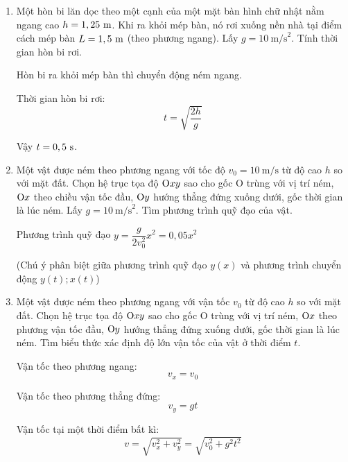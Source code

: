 \begin{enumerate}[label=\bfseries Câu \arabic*:]
{	Vậy thời gian rơi là $t=3,2\ \text s$.
}
\item {}

\cauhoi
{Một hòn bi lăn dọc theo một cạnh của một mặt bàn hình chữ nhật nằm ngang cao $h=1,25\ \text m$. Khi ra khỏi mép bàn, nó rơi xuống nền nhà tại điểm cách mép bàn $L=1,5\ \text m$ (theo phương ngang). Lấy $g=10\ \text{m/s}^2$. Tính thời gian hòn bi rơi.
}

\loigiai
{	Hòn bi ra khỏi mép bàn thì chuyển động ném ngang.
	
	Thời gian hòn bi rơi:
	\[t=\sqrt{\dfrac{2h}{g}}\]
	
	Vậy $t= 0,5\ \text s$.
}
\item {}

\cauhoi
{Một vật được ném theo phương ngang với tốc độ $v_0 = 10\ \text{m/s}$ từ độ cao $h$ so với mặt đất. Chọn hệ trục tọa độ $\text Oxy$ sao cho gốc O trùng với vị trí ném, $\text O x$ theo chiều vận tốc đầu, $\text Oy$ hướng thẳng đứng xuống dưới, gốc thời gian là lúc ném. Lấy $g=10\ \text{m/s}^2$. Tìm phương trình quỹ đạo của vật.
}

\loigiai
{	Phương trình quỹ đạo $y=\dfrac{g}{2v_0^2}x^2 = 0,05x^2$
	
	(Chú ý phân biệt giữa phương trình quỹ đạo $y(x)$ và phương trình chuyển động $y(t); x(t)$)
}
\item {}

\cauhoi
{Một vật được ném theo phương ngang với vận tốc $v_0$ từ độ cao $h$ so với mặt đất. Chọn hệ trục tọa độ $\text Oxy$ sao cho gốc O trùng với vị trí ném, $\text Ox$ theo phương vận tốc đầu, $\text Oy$ hướng thẳng đứng xuống dưới, gốc thời gian là lúc ném. Tìm biểu thức xác định độ lớn vận tốc của vật ở thời điểm $t$.
}

\loigiai
{	Vận tốc theo phương ngang:
	\[v_x = v_0\]
	
	Vận tốc theo phương thẳng đứng:
	\[v_y=gt\]
	
	Vận tốc tại một thời điểm bất kì:
	\[v=\sqrt{v_x ^2 + v_y ^2 } = \sqrt{v_0^2 + g^2 t^2}\]
}
\end{enumerate}